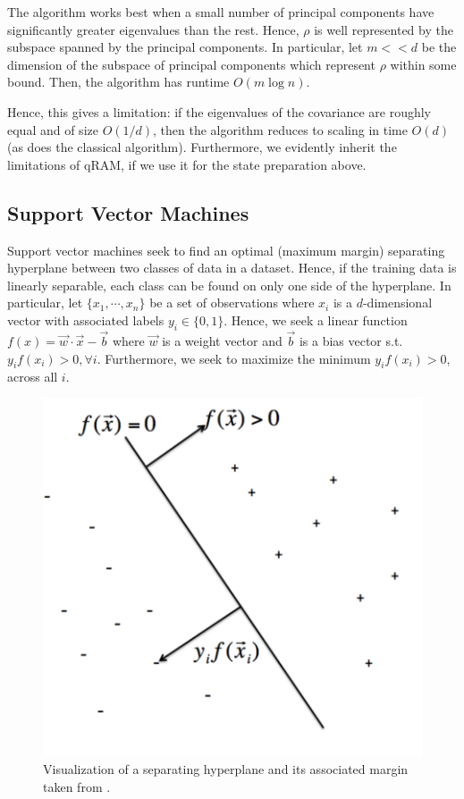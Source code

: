 \documentclass[main.tex]{subfiles}
\begin{document}
The algorithm works best when a small number of principal components have significantly greater eigenvalues than the rest. Hence, $\rho$ is well represented by the subspace spanned by the principal components. In particular, let $m << d$ be the dimension of the subspace of principal components which represent $\rho$ within some bound. Then, the algorithm has runtime $O(m \log n )$. 

Hence, this gives a limitation: if the eigenvalues of the covariance are roughly equal and of size $O(1/d)$, then the algorithm reduces to scaling in time $O(d)$ (as does the classical algorithm). Furthermore, we evidently inherit the limitations of qRAM, if we use it for the state preparation above.  

\subsection{Support Vector Machines}
\label{sec:svm}

Support vector machines seek to find an optimal (maximum margin) separating hyperplane between two classes of data in a dataset. Hence, if the training data is linearly separable, each class can be found on only one side of the hyperplane. In particular, let $\{ x_1 , \cdots , x_n \}$ be a set of observations where $x_i$ is a $d$-dimensional vector with associated labels $y_i \in \{ 0 , 1\}$. Hence, we seek a linear function $f(x) = \vec{w} \cdot \vec{x} - \vec{b}$ where $\vec{w}$ is a weight vector and $\vec{b}$ is a bias vector s.t. $y_if(x_i) > 0, \forall i$. Furthermore, we seek to maximize the minimum $y_i f(x_i) > 0$, across all $i$. 

\begin{figure}[H]
\centering
\includegraphics[width=0.5\linewidth]{images/svm.png}	
\caption{Visualization of a separating hyperplane and its associated margin taken from \cite{rudin}.}
\end{figure}
\end{document}
